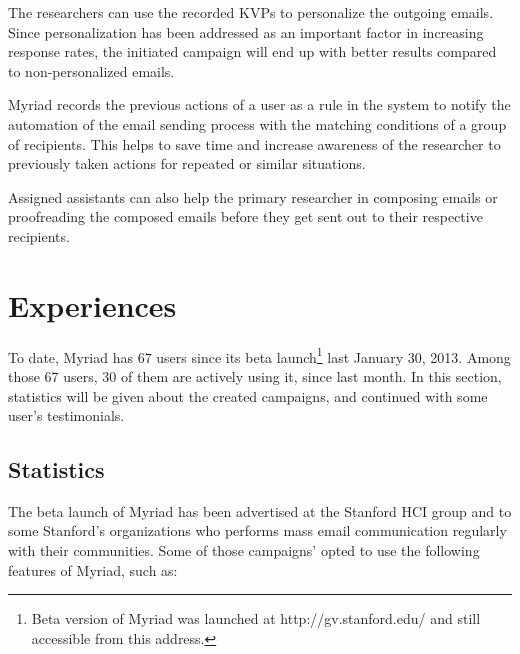 The researchers can use the recorded \ac{KVP}s to personalize the outgoing emails. Since personalization has been addressed as an important factor in increasing response rates, the initiated campaign will end up with better results compared to non-personalized emails.
\vspace{1cm}

Myriad records the previous actions of a user as a rule in the system to notify the automation of the email sending process with the matching conditions of a group of recipients. This helps to save time and increase awareness of the researcher to previously taken actions for repeated or similar situations.
\vspace{1cm}

Assigned assistants can also help the primary researcher in composing emails or proofreading the composed emails before they get sent out to their respective recipients.


\section{Experiences}
\label{sec:5.5:Expr}

To date, Myriad has 67 users since its beta launch\footnote{Beta version of Myriad was launched at http://gv.stanford.edu/ and still accessible from this address.} last January 30, 2013. Among those 67 users, 30 of them are actively using it, since last month. In this section, statistics will be given about the created campaigns, and continued with some user's testimonials.

\subsection{Statistics}
\label{subsec:5.4.1:Stat}

The beta launch of Myriad has been advertised at the Stanford \ac{HCI} group and to some Stanford's organizations who performs mass email communication regularly with their communities. Some of those campaigns' opted to use the following features of Myriad, such as:

